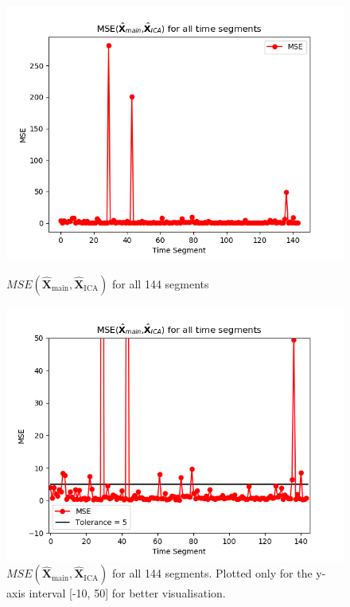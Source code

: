 \begin{figure}[H]
\begin{widepage}
    \begin{minipage}[t]{.45\textwidth}
		\centering
		\includegraphics[width=1\linewidth]{figures/ch_7/resultat/average_mse_none_removed_ica}
	\caption{$MSE\left(\hat{\mathbf{X}}_{\text{main}},\hat{\mathbf{X}}_{\text{ICA}}\right)$ for all 144 segments}
	\label{fig:M=N_1}
    \end{minipage} 
    \hspace{0.5cm}
    \begin{minipage}[t]{.45\textwidth}
        \centering
		\includegraphics[width=1\linewidth]{figures/ch_7/resultat/average_mse_none_removed_ica_zoom.png}
	\caption{$MSE\left(\hat{\mathbf{X}}_{\text{main}},\hat{\mathbf{X}}_{\text{ICA}}\right)$ for all 144 segments. Plotted only for the y-axis interval [-10, 50] for better visualisation.}
	\label{fig:M=N_1_2}
    \end{minipage}
\end{widepage}
\end{figure}
